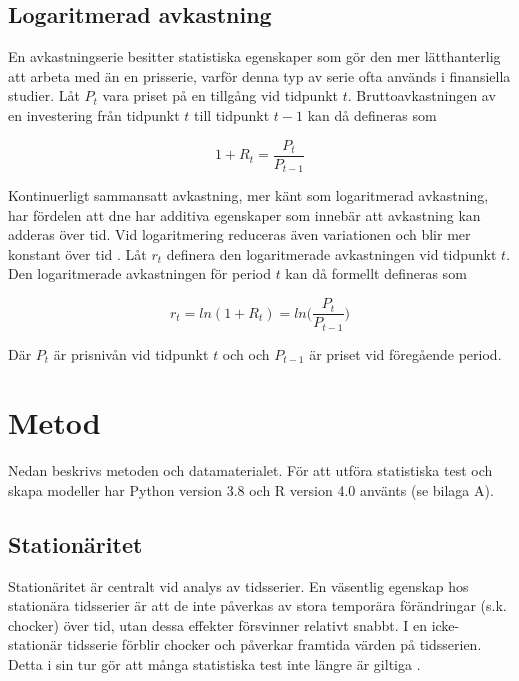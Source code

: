 \documentclass[11pt]{article}
\numberwithin{equation}{section}
\numberwithin{table}{section}
\numberwithin{figure}{section}
\begin{document}
\subsection{Logaritmerad avkastning}

En avkastningserie besitter statistiska egenskaper som gör den mer lätthanterlig att arbeta med än en prisserie, varför denna typ av serie ofta används i finansiella studier. Låt $P_{t}$ vara priset på en tillgång vid tidpunkt $t$. Bruttoavkastningen av en investering från tidpunkt $t$ till tidpunkt $t-1$ kan då defineras som

\begin{equation}
    1+R_{t} = \frac{P_{t}}{P_{t-1}}
\end{equation}


Kontinuerligt sammansatt avkastning, mer känt som logaritmerad avkastning, har fördelen att dne har additiva egenskaper som innebär att avkastning kan adderas över tid.  Vid logaritmering reduceras även variationen och blir mer konstant över tid \parencite{tsay}. Låt $r_{t}$ definera den logaritmerade avkastningen vid tidpunkt $t$. Den logaritmerade avkastningen för period $t$ kan då formellt defineras som

\begin{equation}
    r_{t} = ln(1+R_{t}) = ln \Big( \frac{P_{t}}{P_{t-1}} \Big)
\end{equation}

Där $P_{t}$ är prisnivån vid tidpunkt $t$ och och $P_{t-1}$ är priset vid föregående period. 









\newpage
\section{Metod}
Nedan beskrivs metoden och datamaterialet. För att utföra statistiska test och skapa modeller har Python version 3.8 och R version 4.0 använts (se bilaga A). 

\subsection{Stationäritet}
Stationäritet är centralt vid analys av tidsserier. En väsentlig egenskap hos stationära tidsserier är att de inte påverkas av stora temporära förändringar (s.k. chocker) över tid, utan dessa effekter försvinner relativt snabbt. I en icke-stationär tidsserie förblir chocker och påverkar framtida värden på tidsserien. Detta i sin tur gör att många statistiska test inte längre är giltiga \parencite[][,s.329 f.]{montgomery2015forecasting}. \par
\end{document}
